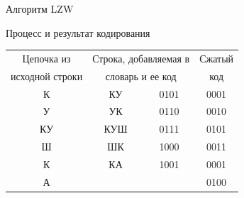 \documentclass[11pt]{beamer}
\begin{document}
 
\begin{frame}{Алгоритм LZW}
\begin{block}{Процесс и результат кодирования}
\begin{table}[H]
\begin{center}
	\begin{tabular}{|c|c|c|c|}
		\hline	
		  Цепочка из & \multicolumn{2}{|c|}{Строка, добавляемая в} & Сжатый \\
		  исходной строки & \multicolumn{2}{|c|}{словарь и ее код} & код \\
		\hline
	  	  К    & КУ & 0101 & 0001 \\
		\hline
		  У	   & УК & 0110 & 0010 \\
		\hline  
		  КУ   & КУШ & 0111 & 0101 \\
		\hline  	
		  Ш    & ШК & 1000 & 0011 \\
		\hline
		  К    & КА & 1001 & 0001 \\
		\hline
		  А    &    &      & 0100 \\
		\hline
	\end{tabular}
\end{center}
\end{table}
\end{block}				
\end{frame} 
\end{document}

